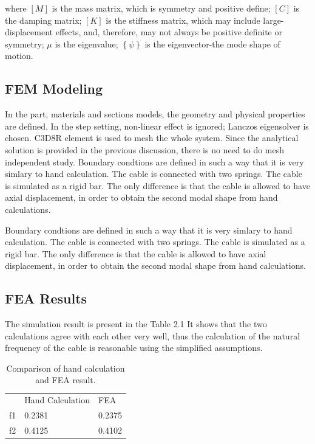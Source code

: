 \documentclass[paper=a4, fontsize=11pt]{scrartcl} %
\numberwithin{equation}{section} %
\numberwithin{figure}{section} %
\numberwithin{table}{section} %
\begin{document}
where $[M]$ is the mass matrix, which is symmetry and positive define;
$[C]$ is the damping matrix; $[K]$ is the stiffness matrix, which may
include large-displacement effects, and, therefore, may not always be
positive definite or symmetry; $\mu$ is the eigenvalue;
$\left\{\psi\right\}$ is the eigenvector-the mode shape of motion.

\subsection{FEM Modeling}
\label{sec:fem-modeling}

In the part, materials and sections models, the geometry and physical
properties are defined. In the step setting, non-linear effect is
ignored; Lanczos eigensolver is chosen. C3D8R element is used to
mesh the whole system. Since the analytical solution is provided
in the previous discussion, there is no need to do mesh independent
study. Boundary condtions are defined in such a way that it is very
simlary to hand calculation. The cable is connected with two springs.
The cable is simulated as a rigid bar. The only difference is that the
cable is allowed to have axial displacement, in order to obtain the
second modal shape from hand calculations.

Boundary condtions are defined in such a way that it is very simlary
to hand calculation. The cable is connected with two springs. The
cable is simulated as a rigid bar. The only difference is that the
cable is allowed to have axial displacement, in order to obtain the
second modal shape from hand calculations.

\subsection{FEA Results}
\label{sec:fea-results}

The simulation result is present in the Table 2.1 It shows that the two
calculations agree with each other very well, thus the calculation of
the natural frequency of the cable is reasonable using the simplified
assumptions.

\begin{table}
  \centering
  \begin{tabular}{lll}
    \hline    
   & Hand Calculation &FEA \\
   f1&	0.2381&	0.2375 \\
    f2&	0.4125&	0.4102 \\
    \hline
  \end{tabular}
  \caption{Comparison of hand calculation and FEA result.}
\end{table}
\end{document}
